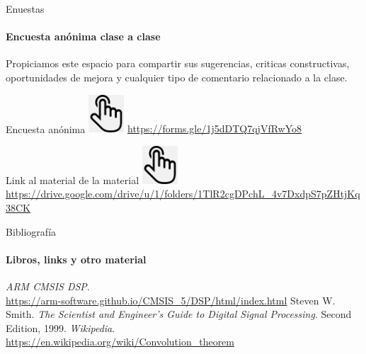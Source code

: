  \begin{frame}{Enuestas}
    \framesubtitle{Encuesta anónima clase a clase}
    Propiciamos este espacio para compartir sus sugerencias, criticas constructivas, oportunidades de mejora y cualquier tipo de comentario relacionado a la clase.
    \begin{block}{Encuesta anónima}{
       \includegraphics[width=0.1\textwidth]{1_clase/click}
       \href{https://forms.gle/1j5dDTQ7qjVfRwYo8}{https://forms.gle/1j5dDTQ7qjVfRwYo8}
    }
       \end{block}
    \begin{block}{Link al material de la material}{
       \includegraphics[width=0.1\textwidth]{1_clase/click}
       \tiny{\href{https://drive.google.com/drive/u/1/folders/1TlR2cgDPchL\_4v7DxdpS7pZHtjKq38CK}{https://drive.google.com/drive/u/1/folders/1TlR2cgDPchL\_4v7DxdpS7pZHtjKq38CK}
    }
    }
       \end{block}
\end{frame}
\begin{frame}{Bibliografía}
   \framesubtitle{Libros, links y otro material}
   \begin{thebibliography}{9}
         \emph{ARM CMSIS DSP}. \\
         \href {https://arm-software.github.io/CMSIS_5/DSP/html/index.html}{https://arm-software.github.io/CMSIS\_5/DSP/html/index.html}
         Steven W. Smith.
         \emph{The Scientist and Engineer's Guide to Digital Signal Processing}.
         Second Edition, 1999.
         \emph{Wikipedia}. \\
         \href {https://en.wikipedia.org/wiki/Convolution\_theorem}{https://en.wikipedia.org/wiki/Convolution\_theorem}
   \end{thebibliography}
\end{frame}
